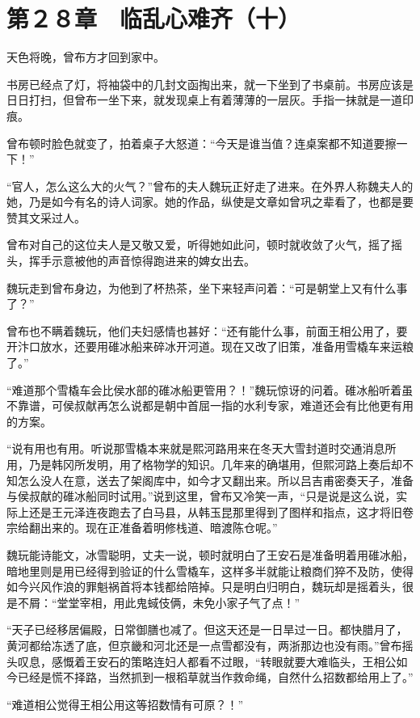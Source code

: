 \section{第２８章　临乱心难齐（十）}

天色将晚，曾布方才回到家中。

书房已经点了灯，将袖袋中的几封文函掏出来，就一下坐到了书桌前。书房应该是日日打扫，但曾布一坐下来，就发现桌上有着薄薄的一层灰。手指一抹就是一道印痕。

曾布顿时脸色就变了，拍着桌子大怒道：“今天是谁当值？连桌案都不知道要擦一下！”

“官人，怎么这么大的火气？”曾布的夫人魏玩正好走了进来。在外界人称魏夫人的她，乃是如今有名的诗人词家。她的作品，纵使是文章如曾巩之辈看了，也都是要赞其文采过人。

曾布对自己的这位夫人是又敬又爱，听得她如此问，顿时就收敛了火气，摇了摇头，挥手示意被他的声音惊得跑进来的婢女出去。

魏玩走到曾布身边，为他到了杯热茶，坐下来轻声问着：“可是朝堂上又有什么事了？”

曾布也不瞒着魏玩，他们夫妇感情也甚好：“还有能什么事，前面王相公用了，要开汴口放水，还要用碓冰船来碎冰开河道。现在又改了旧策，准备用雪橇车来运粮了。”

“难道那个雪橇车会比侯水部的碓冰船更管用？！”魏玩惊讶的问着。碓冰船听着虽不靠谱，可侯叔献再怎么说都是朝中首屈一指的水利专家，难道还会有比他更有用的方案。

“说有用也有用。听说那雪橇本来就是熙河路用来在冬天大雪封道时交通消息所用，乃是韩冈所发明，用了格物学的知识。几年来的确堪用，但熙河路上奏后却不知怎么没人在意，送去了架阁库中，如今才又翻出来。所以吕吉甫密奏天子，准备与侯叔献的碓冰船同时试用。”说到这里，曾布又冷笑一声，“只是说是这么说，实际上还是王元泽连夜跑去了白马县，从韩玉昆那里得到了图样和指点，这才将旧卷宗给翻出来的。现在正准备着明修栈道、暗渡陈仓呢。”

魏玩能诗能文，冰雪聪明，丈夫一说，顿时就明白了王安石是准备明着用碓冰船，暗地里则是用已经得到验证的什么雪橇车，这样多半就能让粮商们猝不及防，使得如今兴风作浪的罪魁祸首将本钱都给陪掉。只是明白归明白，魏玩却是摇着头，很是不屑：“堂堂宰相，用此鬼蜮伎俩，未免小家子气了点！”

“天子已经移居偏殿，日常御膳也减了。但这天还是一日旱过一日。都快腊月了，黄河都给冻透了底，但京畿和河北还是一点雪都没有，两浙那边也没有雨。”曾布摇头叹息，感慨着王安石的策略连妇人都看不过眼，“转眼就要大难临头，王相公如今已经是慌不择路，当然抓到一根稻草就当作救命绳，自然什么招数都给用上了。”

“难道相公觉得王相公用这等招数情有可原？！”


